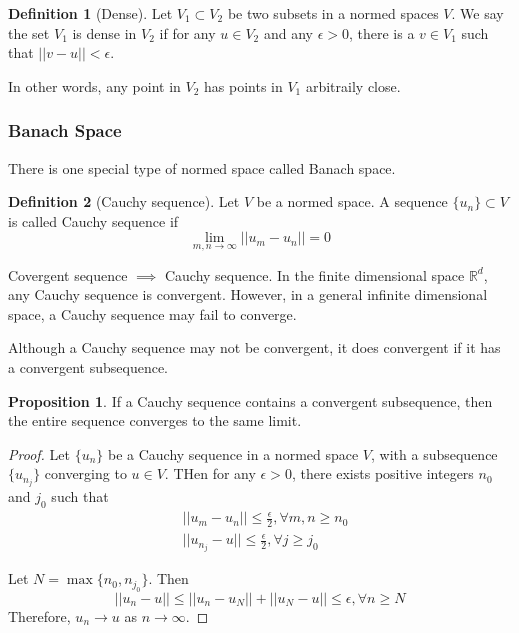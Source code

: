 \documentclass{article}
\theoremstyle{definition}
\newtheorem{definition}{Definition}[section]
\newtheorem{proposition}{Proposition}[section]
\begin{document}
\begin{definition}[Dense]
Let $V_1 \subset V_2$ be two subsets in a normed spaces $V$. We say the set $V_1$ is dense in $V_2$ if for any $u \in V_2$ and any $\epsilon >0$, there is a $v\in V_1$ such that $||v-u||<\epsilon$.
\end{definition}
In other words, any point in $V_2$ has points in $V_1$ arbitraily close.

\subsubsection{Banach Space}
There is one special type of normed space called Banach space.

\begin{definition}[Cauchy sequence]
Let $V$ be a normed space. A sequence $\{u_n\} \subset V$ is called Cauchy sequence if
\begin{equation}
\lim_{m,n \to \infty}||u_m-u_n||=0
\end{equation}
\end{definition}

Covergent sequence $\implies$ Cauchy sequence. In the finite dimensional space $\mathbb{R}^d$, any Cauchy sequence is convergent. However, in a general infinite dimensional space, a Cauchy sequence may fail to converge.

Although a Cauchy sequence may not be convergent, it does convergent if it has a convergent subsequence.

\begin{proposition}
If a Cauchy sequence contains a convergent subsequence, then the entire sequence converges to the same limit.
\end{proposition}
\begin{proof}
Let $\{u_n\}$ be a Cauchy sequence in a normed space $V$, with a subsequence $\{u_{n_j}\}$ converging to $u\in V$. THen for any $\epsilon >0$, there exists positive integers $n_0$ and $j_0$ such that
\begin{align}
&||u_m-u_n||\leq \frac{\epsilon}{2}, \forall m,n \geq n_0\\
&||u_{n_j}-u||\leq \frac{\epsilon}{2}, \forall j \geq j_0
\end{align}

Let $N=\max\{n_0,n_{j_0}\}$. Then
\begin{equation}
||u_n-u||\leq ||u_n-u_N||+||u_N-u||\leq \epsilon, \forall n \geq N
\end{equation}
Therefore, $u_n \to u$ as $n\to \infty$.
\end{proof}
\end{document}
